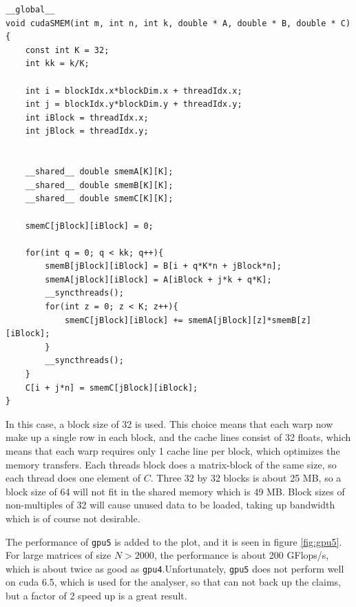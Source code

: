 \begin{lstlisting}[caption = Source code for the shared memory kernel]
__global__
void cudaSMEM(int m, int n, int k, double * A, double * B, double * C){
	const int K = 32;	
	int kk = k/K;

	int i = blockIdx.x*blockDim.x + threadIdx.x;
	int j = blockIdx.y*blockDim.y + threadIdx.y;
	int iBlock = threadIdx.x;
	int jBlock = threadIdx.y;


	__shared__ double smemA[K][K];
	__shared__ double smemB[K][K];
	__shared__ double smemC[K][K];

	smemC[jBlock][iBlock] = 0;

	for(int q = 0; q < kk; q++){
		smemB[jBlock][iBlock] = B[i + q*K*n + jBlock*n];
		smemA[jBlock][iBlock] = A[iBlock + j*k + q*K];
		__syncthreads();
		for(int z = 0; z < K; z++){
			smemC[jBlock][iBlock] += smemA[jBlock][z]*smemB[z][iBlock];
		}
		__syncthreads();
	}
	C[i + j*n] = smemC[jBlock][iBlock];
}
\end{lstlisting}
In this case, a block size of 32 is used. This choice means that each warp now make up a single row in each block, and the cache lines consist of 32 floats, which means that each warp requires only 1 cache line per block, which optimizes the memory transfers. Each threads block does a matrix-block of the same size, so each thread does one element of $C$. Three 32 by 32 blocks is about 25 MB, so a block size of 64 will not fit in the shared memory which is 49 MB. Block sizes of non-multiples of 32 will cause unused data to be loaded, taking up bandwidth which is of course not desirable.

The performance of \texttt{gpu5} is added to the plot, and it is seen in figure \ref{fig:gpu5}. For large matrices of size $N>2000$, the performance is about 200 GFlops/s, which is about twice as good as \texttt{gpu4}.Unfortunately, \texttt{gpu5} does not perform well on cuda 6.5, which is used for the analyser, so that can not back up the claims, but a factor of 2 speed up is a great result.

